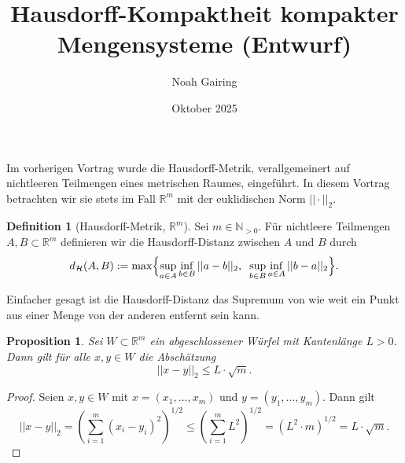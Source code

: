 \documentclass[a4paper,12pt]{article}
\title{Hausdorff-Kompaktheit kompakter Mengensysteme (Entwurf)}
\author{Noah Gairing}
\date{Oktober 2025}
\theoremstyle{definition}
\newtheorem{definition}{Definition}
\theoremstyle{plain}
\newtheorem{proposition}{Proposition}
\def\H{\mathcal{H}}
\def\N{\mathbb{N}}
\def\R{\mathbb{R}}
\begin{document}
\maketitle

Im vorherigen Vortrag wurde die Hausdorff-Metrik, verallgemeinert auf nichtleeren Teilmengen eines metrischen Raumes, eingeführt. In diesem Vortrag betrachten wir sie stets im Fall $\R^m$ mit der euklidischen Norm $||\cdot||_2$.

\begin{definition}[Hausdorff-Metrik, $\R^m$]
  Sei $m \in \N_{>0}$. Für nichtleere Teilmengen $A, B \subset \R^m$ definieren wir die Hausdorff-Distanz zwischen $A$ und $B$ durch
  \[
    d_\H(A,B) := \max\Bigl\{ \sup_{a \in A} \inf_{b \in B} ||a-b||_2, \;\; \sup_{b \in B} \inf_{a \in A} ||b-a||_2 \Bigr\}.
  \]

  Einfacher gesagt ist die Hausdorff-Distanz das Supremum von wie weit ein Punkt aus einer Menge von der anderen entfernt sein kann.
\end{definition}

\begin{proposition}
  \label{prop:wuerfel-approx}
  Sei $W \subset \R^m$ ein abgeschlossener Würfel mit Kantenlänge $L > 0$. Dann gilt für alle $x, y \in W$ die Abschätzung
  \[
    ||x - y||_2 \leq L \cdot \sqrt{m}.
  \]
\end{proposition}
\begin{proof}
  Seien $x, y \in W$ mit $x = (x_1, \ldots, x_m)$ und $y = (y_1, \ldots, y_m)$. Dann gilt
  \[
    ||x - y||_2 = \left( \sum_{i=1}^m (x_i - y_i)^2 \right)^{1/2} \leq \left( \sum_{i=1}^m L^2 \right)^{1/2} = (L^2 \cdot m)^{1/2} = L \cdot \sqrt{m}.
  \]
\end{proof}
\end{document}
